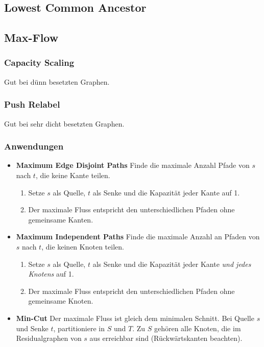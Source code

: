 \subsection{Lowest Common Ancestor}


\subsection{Max-Flow}

\subsubsection{Capacity Scaling}
Gut bei dünn besetzten Graphen.


\subsubsection{Push Relabel}
Gut bei sehr dicht besetzten Graphen.


\subsubsection{Anwendungen}
\begin{itemize}[nosep]
	\item \textbf{Maximum Edge Disjoint Paths}\newline
	Finde die maximale Anzahl Pfade von $s$ nach $t$, die keine Kante teilen.
	\begin{enumerate}[nosep]
		\item Setze $s$ als Quelle, $t$ als Senke und die Kapazität jeder Kante auf 1.
		\item Der maximale Fluss entspricht den unterschiedlichen Pfaden ohne gemeinsame Kanten.
	\end{enumerate}
	\item \textbf{Maximum Independent Paths}\newline
	Finde die maximale Anzahl an Pfaden von $s$ nach $t$, die keinen Knoten teilen.
	\begin{enumerate}[nosep]
		\item Setze $s$ als Quelle, $t$ als Senke und die Kapazität jeder Kante \emph{und jedes Knotens} auf 1.
		\item Der maximale Fluss entspricht den unterschiedlichen Pfaden ohne gemeinsame Knoten.
	\end{enumerate}
	\item \textbf{Min-Cut}\newline
	Der maximale Fluss ist gleich dem minimalen Schnitt.
	Bei Quelle $s$ und Senke $t$, partitioniere in $S$ und $T$.
	Zu $S$ gehören alle Knoten, die im Residualgraphen von $s$ aus erreichbar sind (Rückwärtskanten beachten).
\end{itemize}

